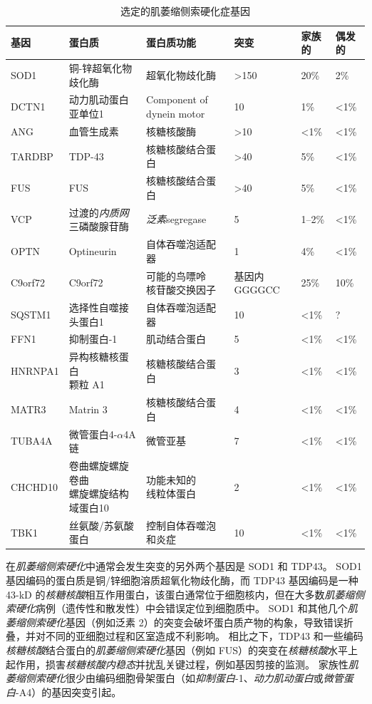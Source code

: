 \begin{table}[htbp]
	\caption{选定的肌萎缩侧索硬化症基因\cite{taylor2016decoding}} \label{tab:57_2} \centering
	\begin{tabular}{llllll}
		\toprule
		基因 & 蛋白质 & 蛋白质功能 & 突变 & 家族的 & 偶发的 \\
		\midrule
		SOD1 & 铜-锌超氧化物歧化酶 & 超氧化物歧化酶 & >150 & 20\% & 2\% \\
		DCTN1 & 动力肌动蛋白亚单位1 & Component of dynein motor & 10 & 1\% & <1\% \\
		ANG & 血管生成素 & 核糖核酸酶 & >10 & <1\% & <1\% \\
		TARDBP & TDP-43 & 核糖核酸结合蛋白 & >40 & 5\% & <1\% \\
		FUS & FUS & 核糖核酸结合蛋白 & >40 & 5\% & <1\% \\
		VCP & \makecell[l]{过渡的\textit{内质网}\\三磷酸腺苷酶} & \textit{泛素}segregase & 5 & 1–2\% & <1\% \\
		OPTN & Optineurin & 自体吞噬泡适配器 & 1 & 4\% & <1\% \\
		C9orf72 & C9orf72 & \makecell[l]{可能的鸟嘌呤\\核苷酸交换因子} & 基因内GGGGCC & 25\% & 10\% \\
		SQSTM1 & 选择性自噬接头蛋白1 & 自体吞噬泡适配器 & 10 & <1\% & ? \\
		FFN1 & 抑制蛋白-1 & 肌动结合蛋白 & 5 & <1\% & <1\% \\
		HNRNPA1 & \makecell[l]{异构核糖核蛋白\\颗粒 A1} & 核糖核酸结合蛋白 & 3 & <1\% & <1\% \\
		MATR3 & Matrin 3 & 核糖核酸结合蛋白 & 4 & <1\% & <1\% \\
		TUBA4A & 微管蛋白4-$\alpha$4A 链 & 微管亚基 & 7 & <1\% & <1\% \\
		CHCHD10 & \makecell[l]{卷曲螺旋螺旋卷曲\\螺旋螺旋结构域蛋白10} & \makecell[l]{功能未知的\\线粒体蛋白} & 2 & <1\% & <1\% \\
		TBK1 & \makecell[l]{丝氨酸/苏氨酸\\蛋白} & \makecell[l]{控制自体吞噬泡\\和炎症} & 10 & <1\% & <1\% \\
		\bottomrule
	\end{tabular}
\end{table}


在\textit{肌萎缩侧索硬化}中通常会发生突变的另外两个基因是 SOD1 和 TDP43。
SOD1 基因编码的蛋白质是铜/锌细胞溶质超氧化物歧化酶，而 TDP43 基因编码是一种 43-kD 的\textit{核糖核酸}相互作用蛋白，该蛋白通常位于细胞核内，但在大多数\textit{肌萎缩侧索硬化}病例（遗传性和散发性）中会错误定位到细胞质中。
SOD1 和其他几个\textit{肌萎缩侧索硬化}基因（例如泛素 2）的突变会破坏蛋白质产物的构象，导致错误折叠，并对不同的亚细胞过程和区室造成不利影响。
相比之下，TDP43 和一些编码\textit{核糖核酸}结合蛋白的\textit{肌萎缩侧索硬化}基因（例如 FUS）的突变在\textit{核糖核酸}水平上起作用，损害\textit{核糖核酸}\textit{内稳态}并扰乱关键过程，例如基因剪接的监测。
家族性\textit{肌萎缩侧索硬化}很少由编码细胞骨架蛋白（如\textit{抑制蛋白}-1、\textit{动力肌动蛋白}或\textit{微管蛋白}-A4）的基因突变引起。


